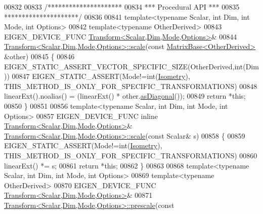 \begin{DoxyCode}
00832 
00833 \textcolor{comment}{/*********************}
00834 \textcolor{comment}{*** Procedural API ***}
00835 \textcolor{comment}{*********************/}
00836 
00841 \textcolor{keyword}{template}<\textcolor{keyword}{typename} Scalar, \textcolor{keywordtype}{int} Dim, \textcolor{keywordtype}{int} Mode, \textcolor{keywordtype}{int} Options>
00842 \textcolor{keyword}{template}<\textcolor{keyword}{typename} OtherDerived>
00843 EIGEN\_DEVICE\_FUNC \hyperlink{group___geometry___module_class_eigen_1_1_transform}{Transform<Scalar,Dim,Mode,Options>}&
00844 \hyperlink{group___geometry___module_class_eigen_1_1_transform}{Transform<Scalar,Dim,Mode,Options>::scale}(\textcolor{keyword}{const} 
      \hyperlink{group___core___module_class_eigen_1_1_matrix_base}{MatrixBase<OtherDerived>} &other)
00845 \{
00846   EIGEN\_STATIC\_ASSERT\_VECTOR\_SPECIFIC\_SIZE(OtherDerived,\textcolor{keywordtype}{int}(Dim))
00847   EIGEN\_STATIC\_ASSERT(Mode!=\textcolor{keywordtype}{int}(\hyperlink{group__enums_ggaee59a86102f150923b0cac6d4ff05107a080cd5366173608f701cd945c2335568}{Isometry}), THIS\_METHOD\_IS\_ONLY\_FOR\_SPECIFIC\_TRANSFORMATIONS)
00848   linearExt().noalias() = (linearExt() * other.\hyperlink{group___core___module_a14235b62c90f93fe910070b4743782d0}{asDiagonal}());
00849   \textcolor{keywordflow}{return} *\textcolor{keyword}{this};
00850 \}
00851 
00856 \textcolor{keyword}{template}<\textcolor{keyword}{typename} Scalar, \textcolor{keywordtype}{int} Dim, \textcolor{keywordtype}{int} Mode, \textcolor{keywordtype}{int} Options>
00857 EIGEN\_DEVICE\_FUNC \textcolor{keyword}{inline} \hyperlink{group___geometry___module_class_eigen_1_1_transform}{Transform<Scalar,Dim,Mode,Options>}& 
      \hyperlink{group___geometry___module_class_eigen_1_1_transform}{Transform<Scalar,Dim,Mode,Options>::scale}(\textcolor{keyword}{const} Scalar& s)
00858 \{
00859   EIGEN\_STATIC\_ASSERT(Mode!=\textcolor{keywordtype}{int}(\hyperlink{group__enums_ggaee59a86102f150923b0cac6d4ff05107a080cd5366173608f701cd945c2335568}{Isometry}), THIS\_METHOD\_IS\_ONLY\_FOR\_SPECIFIC\_TRANSFORMATIONS)
00860   linearExt() *= s;
00861   \textcolor{keywordflow}{return} *\textcolor{keyword}{this};
00862 \}
00863 
00868 \textcolor{keyword}{template}<\textcolor{keyword}{typename} Scalar, \textcolor{keywordtype}{int} Dim, \textcolor{keywordtype}{int} Mode, \textcolor{keywordtype}{int} Options>
00869 \textcolor{keyword}{template}<\textcolor{keyword}{typename} OtherDerived>
00870 EIGEN\_DEVICE\_FUNC \hyperlink{group___geometry___module_class_eigen_1_1_transform}{Transform<Scalar,Dim,Mode,Options>}&
00871 \hyperlink{group___geometry___module_class_eigen_1_1_transform}{Transform<Scalar,Dim,Mode,Options>::prescale}(\textcolor{keyword}{const} 

\end{DoxyCode}
